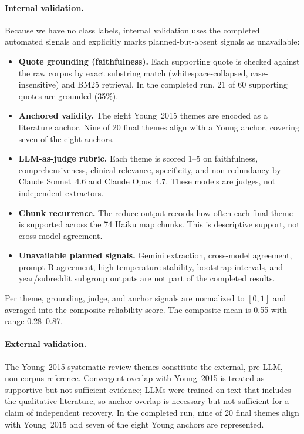 \documentclass[11pt]{article}
\begin{document}
\paragraph{Internal validation.}
Because we have no class labels, internal validation uses the completed
automated signals and explicitly marks planned-but-absent signals as
unavailable:
\begin{itemize}[leftmargin=1.2em]
  \item \textbf{Quote grounding (faithfulness).} Each supporting quote
    is checked against the raw corpus by exact substring match
    (whitespace-collapsed, case-insensitive) and BM25 retrieval. In the
    completed run, 21 of 60 supporting quotes are grounded (35\%).
  \item \textbf{Anchored validity.} The eight Young~2015 themes are
    encoded as a literature anchor. Nine of 20 final themes align with
    a Young anchor, covering seven of the eight anchors.
  \item \textbf{LLM-as-judge rubric.} Each theme is scored 1--5 on
    faithfulness, comprehensiveness, clinical relevance, specificity,
    and non-redundancy by Claude Sonnet~4.6 and Claude Opus~4.7. These
    models are judges, not independent extractors.
  \item \textbf{Chunk recurrence.} The reduce output records how often
    each final theme is supported across the 74 Haiku map chunks. This
    is descriptive support, not cross-model agreement.
  \item \textbf{Unavailable planned signals.} Gemini extraction,
    cross-model agreement, prompt-B agreement, high-temperature
    stability, bootstrap intervals, and year/subreddit subgroup outputs
    are not part of the completed results.
\end{itemize}
Per theme, grounding, judge, and anchor signals are normalized to
$[0, 1]$ and averaged into the composite reliability score. The
composite mean is 0.55 with range 0.28--0.87.

\paragraph{External validation.}
The Young~2015 systematic-review themes constitute the external,
pre-LLM, non-corpus reference. Convergent overlap with Young~2015 is
treated as supportive but not sufficient evidence; LLMs were trained on
text that includes the qualitative literature, so anchor overlap is
necessary but not sufficient for a claim of independent recovery. In
the completed run, nine of 20 final themes align with Young~2015 and
seven of the eight Young anchors are represented.
\end{document}
